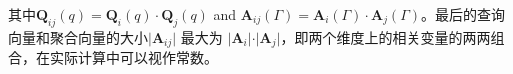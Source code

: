 其中$\mathbf{Q}_{ij}(q)=\mathbf{Q}_i(q) \cdot \mathbf{Q}_j(q)$ and $\mathbf{A}_{ij}(\Gamma)=\mathbf{A}_i(\Gamma) \cdot \mathbf{A}_j(\Gamma)$。最后的查询向量和聚合向量的大小$\vert \mathbf{A}_{ij} \vert$ 最大为 $\vert \mathbf{A}_i \vert \cdot \vert \mathbf{A}_j \vert$，即两个维度上的相关变量的两两组合，在实际计算中可以视作常数。


%
%
%






